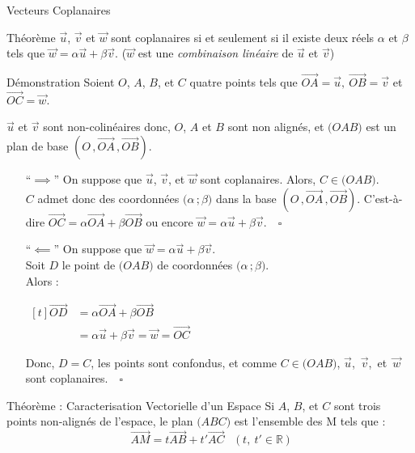 \documentclass{cours}
\begin{document}
\begin{Gpartie}{Vecteurs Coplanaires}
\begin{Spartie}{Théorème}
            $\vec{u}$, $\vec{v}$ et $\vec{w}$ sont coplanaires si et seulement si il existe deux réels $\alpha$ et $\beta$ tels que $\vec{w}=\alpha\vec{u}+\beta\vec{v}$. \quad\big($\vec{w}$ est une \emph{combinaison linéaire} de $\vec{u}$ et $\vec{v}$\big)
            \begin{SSpartie}{Démonstration} 
                Soient $O$, $A$, $B$, et $C$ quatre points tels que $\overrightarrow{OA}=\vec{u},~\overrightarrow{OB}=\vec{v}$ et $\overrightarrow{OC}=\vec{w}$.

                $\vec{u}$ et $\vec{v}$ sont non-colinéaires donc, $O$, $A$ et $B$ sont non alignés, et $\big(OAB\big)$ est un plan de base $\left(O\,,\overrightarrow{OA}\,,\overrightarrow{OB}\right)$.
                \begin{itemize}[leftmargin=7ex]
                    \item[``$\implies$''] On suppose que $\vec{u}$, $\vec{v}$, et $\vec{w}$ sont coplanaires. Alors, $C\in\big(OAB\big)$. \\ $C$ admet donc des coordonnées $\big(\alpha\,;\beta\big)$ dans la base $\left(O\,,\overrightarrow{OA}\,,\overrightarrow{OB}\right)$. C'est-à-dire $\overrightarrow{OC}=\alpha\overrightarrow{OA}+\beta\overrightarrow{OB}$ ou encore $\vec{w}=\alpha\vec{u}+\beta\vec{v}$.$\quad\square$
                    \item[``$\impliedby$''] On suppose que $\vec{w}=\alpha\vec{u}+\beta\vec{v}$. \\ Soit $D$ le point de $\big(OAB\big)$ de coordonnées $\big(\alpha\,;\beta\big)$. \\ Alors :
                     
                    $\begin{aligned}[t]
                        \overrightarrow{OD}&=\alpha\overrightarrow{OA}+\beta\overrightarrow{OB} \\
                        &=\alpha\vec{u}+\beta\vec{v}=\vec{w}=\overrightarrow{OC}
                    \end{aligned}$

                    Donc, $D=C$, les points sont confondus, et comme $C\in\big(OAB\big)$, $\vec{u}$,~$\vec{v}$,~et~$\vec{w}$ sont coplanaires.$\quad\square$
                \end{itemize}
            \end{SSpartie}
            \begin{SSpartie}{Théorème : Caracterisation Vectorielle d'un Espace} 
                Si $A$, $B$, et $C$ sont trois points non-alignés de l'espace, le plan $\big(ABC\big)$ est l'ensemble des M tels que : \[\overrightarrow{AM}=t\overrightarrow{AB}+t'\overrightarrow{AC}\quad\big(~t,~t'\in\mathbb{R}~\big)\]
            \end{SSpartie}
        \end{Spartie}
    \end{Gpartie}
\end{document}
